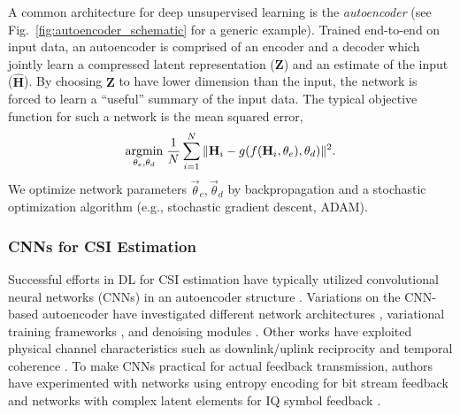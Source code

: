 A common architecture for deep unsupervised learning is the \emph{autoencoder} (see Fig.~\ref{fig:autoencoder_schematic} for a generic example). Trained end-to-end on input data, an autoencoder is comprised of an encoder and a decoder which jointly learn a compressed latent representation ($\mathbf Z$) and an estimate of the input ($\hat{\mathbf H}$). By choosing $\mathbf Z$ to have lower dimension than the input, the network is forced to learn a ``useful'' summary of the input data. The typical objective function for such a network is the mean squared error,
\begin{align*}
\underset{\theta_e, \theta_d}{\text{argmin}}\; \frac 1N \sum_{i=1}^N\Arrowvert \mathbf H_i - g(f(\mathbf H_i, \theta_e), \theta_d) \Arrowvert^2.
\end{align*}
We optimize network parameters $\vec \theta_e, \vec \theta_d$ by backpropagation and a stochastic optimization algorithm (e.g., stochastic gradient descent, ADAM).

\subsubsection{CNNs for CSI Estimation}
\label{sect:dl_csi}

Successful efforts in DL for CSI estimation have typically utilized convolutional neural networks (CNNs) in an autoencoder structure \cite{ref:csinet}. Variations on the CNN-based autoencoder have investigated different network architectures \cite{ref:Lu2020CRNet}, variational training frameworks \cite{ref:Hussien2020PRVNet}, and denoising modules \cite{ref:Sun2020AnciNet}. Other works have exploited physical channel characteristics such as downlink/uplink reciprocity \cite{ref:dualnet} and temporal coherence \cite{ref:Wang2019CsiNetLSTM}. To make CNNs practical for actual feedback transmission, authors have experimented with networks using entropy encoding for bit stream feedback \cite{ref:Yang2019DeepCMC} and networks with complex latent elements for IQ symbol feedback \cite{ref:Mashhadi2020AnalogDeepCMC}.
